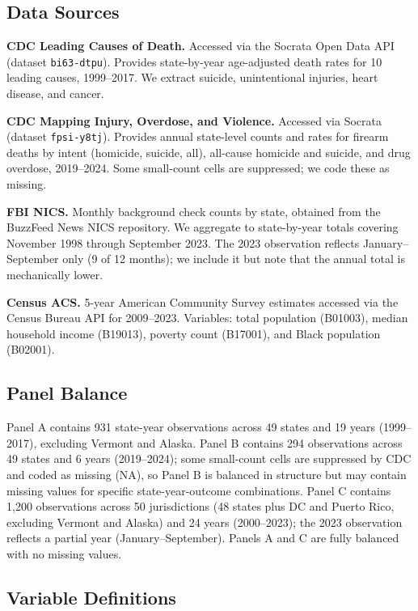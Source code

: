 \documentclass[12pt]{article}
\begin{document}


\subsection{Data Sources}

\textbf{CDC Leading Causes of Death.} Accessed via the Socrata Open Data API (dataset \texttt{bi63-dtpu}). Provides state-by-year age-adjusted death rates for 10 leading causes, 1999--2017. We extract suicide, unintentional injuries, heart disease, and cancer.

\textbf{CDC Mapping Injury, Overdose, and Violence.} Accessed via Socrata (dataset \texttt{fpsi-y8tj}). Provides annual state-level counts and rates for firearm deaths by intent (homicide, suicide, all), all-cause homicide and suicide, and drug overdose, 2019--2024. Some small-count cells are suppressed; we code these as missing.

\textbf{FBI NICS.} Monthly background check counts by state, obtained from the BuzzFeed News NICS repository. We aggregate to state-by-year totals covering November 1998 through September 2023. The 2023 observation reflects January--September only (9 of 12 months); we include it but note that the annual total is mechanically lower.

\textbf{Census ACS.} 5-year American Community Survey estimates accessed via the Census Bureau API for 2009--2023. Variables: total population (B01003), median household income (B19013), poverty count (B17001), and Black population (B02001).

\subsection{Panel Balance}

Panel A contains 931 state-year observations across 49 states and 19 years (1999--2017), excluding Vermont and Alaska. Panel B contains 294 observations across 49 states and 6 years (2019--2024); some small-count cells are suppressed by CDC and coded as missing (NA), so Panel B is balanced in structure but may contain missing values for specific state-year-outcome combinations. Panel C contains 1,200 observations across 50 jurisdictions (48 states plus DC and Puerto Rico, excluding Vermont and Alaska) and 24 years (2000--2023); the 2023 observation reflects a partial year (January--September). Panels A and C are fully balanced with no missing values.

\subsection{Variable Definitions}
\end{document}

